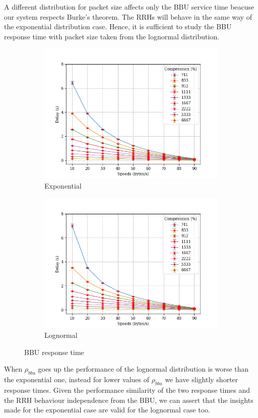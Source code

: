 \documentclass[11pt,a4paper,oneside, openright]{article}
\begin{document}
A different distribution for packet size affects only the BBU service time beacuse our system respects Burke's theorem. The RRHs will behave in the same way of the exponential distribution case. Hence, it is sufficient to study the BBU response time with packet size taken from the lognormal distribution.

\begin{figure}[h]
	\centering
	\begin{subfigure}{.5\textwidth}
		\centering
		\includegraphics[width=\linewidth]{images/bbu-exp}
		\caption{Exponential}
		\label{fig:exponential-bbu-response}
	\end{subfigure}%
	\begin{subfigure}{.5\textwidth}
		\centering
		\includegraphics[width=\linewidth]{images/bbu-logn}
		\caption{Lognormal}
		\label{fig:lognormal-bbu-response}
	\end{subfigure}
	\caption{BBU response time}
	\label{fig:bbu-response}
\end{figure}
When $\rho_{bbu}$ goes up the performance of the lognormal distribution is worse than the exponential one, instead for lower values of $\rho_{bbu}$ we have slightly shorter response times. Given the performance similarity of the two response times and the RRH behaviour independence from the BBU, we can assert that the insights made for the exponential case are valid for the lognormal case too.
\end{document}
